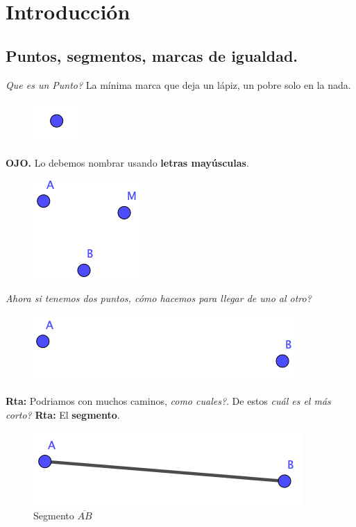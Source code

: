 \chapter{Introducción}
\label{seccion_geometria_introduccion}

\section{Puntos, segmentos, marcas de igualdad.}\label{subseccion_puntos_segmentos_etc}
\textit{Que es un Punto?} La mínima marca que deja un lápiz, un pobre solo en la nada.

\begin{figure}[H]
	\centering
	\includegraphics[width=0.15\linewidth]{Geometria/imgs/punto.png}
	\label{punto}
\end{figure}
\textbf{OJO.} Lo debemos nombrar usando \textbf{letras mayúsculas}.

\begin{figure}[H]
	\centering
	\includegraphics[width=0.15\linewidth]{Geometria/imgs/puntos}
	\label{puntos}
\end{figure}

\textit{Ahora si tenemos dos puntos, cómo hacemos para llegar de uno al otro?}

\begin{figure}[H]
	\centering
	\includegraphics[width=0.4\linewidth]{Geometria/imgs/puntos_A_y_B}
	\label{puntos_A_y_B}
\end{figure}

\textbf{Rta:} Podriamos con muchos caminos, \textit{como cuales?}. De estos \textit{cuál es el más corto?} \textbf{Rta:} El \textbf{segmento}.

\begin{figure}[H]
	\centering
	\includegraphics[width=0.5\linewidth]{Geometria/imgs/segmento_AB}
	\caption{Segmento $\overline{AB}$}
	\label{segmento_AB}
\end{figure}

